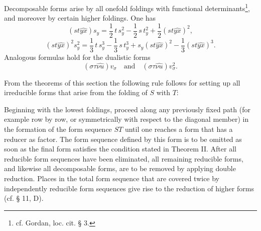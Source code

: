 \documentclass[11pt]{article}
\begin{document}
Decomposable forms arise by all onefold foldings with functional determinants\footnote{cf. Gordan, loc. cit. § 3.}, and moreover by certain higher foldings. One has
\[
(st\widehat{yx})s_y=\frac12\,t\,s_y^2-\frac12\,s\,t_y^2+\frac12(st\widehat{yx})^2,
\]
\[
(st\widehat{yx})^2s_y^2=\frac13\,t\,s_y^3-\frac13\,s\,t_y^3+s_y(st\widehat{yx})^2-\frac13(st\widehat{yx})^3.
\]
Analogous formulas hold for the dualistic forms
\[
(\sigma\tau\widehat{\nu u})v_\sigma
\quad\text{and}\quad
(\sigma\tau\widehat{\nu u})v_\sigma^2.
\]

From the theorems of this section the following rule follows for setting up all irreducible forms that arise from the folding of $S$ with $T$:

Beginning with the lowest foldings, proceed along any previously fixed path (for example row by row, or symmetrically with respect to the diagonal member) in the formation of the form sequence $ST$ until one reaches a form that has a reducer as factor. The form sequence defined by this form is to be omitted as soon as the final form satisfies the condition stated in Theorem II. After all reducible form sequences have been eliminated, all remaining reducible forms, and likewise all decomposable forms, are to be removed by applying double reduction. Places in the total form sequence that are covered twice by independently reducible form sequences give rise to the reduction of higher forms (cf. § 11, D).
\end{document}
